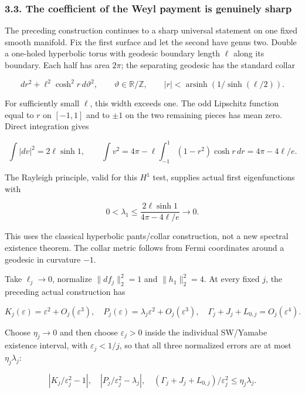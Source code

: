 \documentclass[
  10pt,
]{article}
\begin{document}
\hypertarget{the-coefficient-of-the-weyl-payment-is-genuinely-sharp}{%
\subsubsection{3.3. The coefficient of the Weyl payment is genuinely
sharp}\label{the-coefficient-of-the-weyl-payment-is-genuinely-sharp}}

The preceding construction continues to a sharp universal statement on
one fixed smooth manifold. Fix the first surface and let the second have
genus two. Double a one-holed hyperbolic torus with geodesic boundary
length \(\ell\) along its boundary. Each half has area \(2\pi\); the
separating geodesic has the standard collar

\[
 dr^2+\ell^2\cosh^2r\,d\vartheta^2,\qquad
 \vartheta\in\mathbb R/\mathbb Z,\qquad
 |r|<\operatorname{arsinh}(1/\sinh(\ell/2)).
\]

For sufficiently small \(\ell\), this width exceeds one. The odd
Lipschitz function equal to \(r\) on \([-1,1]\) and to \(\pm1\) on the
two remaining pieces has mean zero. Direct integration gives

\[
 \int|dv|^2=2\ell\sinh1,\qquad
 \int v^2=4\pi-\ell\int_{-1}^1(1-r^2)\cosh r\,dr
          =4\pi-4\ell/e.
\]

The Rayleigh principle, valid for this \(H^1\) test, supplies actual
first eigenfunctions with

\[
 0<\lambda_1\le\frac{2\ell\sinh1}{4\pi-4\ell/e}\longrightarrow0. \tag{3.9}
\]

This uses the classical hyperbolic pants/collar construction, not a new
spectral existence theorem. The collar metric follows from Fermi
coordinates around a geodesic in curvature \(-1\).

Take \(\ell_j\to0\), normalize \(\|df_j\|_2^2=1\) and \(\|h_1\|_2^2=4\).
At every fixed \(j\), the preceding actual construction has

\[
 K_j(\varepsilon)=\varepsilon^2+O_j(\varepsilon^3),\quad
 P_j(\varepsilon)=\lambda_j\varepsilon^2+O_j(\varepsilon^3),\quad
 \Gamma_j+J_j+L_{0,j}=O_j(\varepsilon^4).
\]

Choose \(\eta_j\to0\) and then choose \(\varepsilon_j>0\) inside the
individual SW/Yamabe existence interval, with \(\varepsilon_j<1/j\), so
that all three normalized errors are at most \(\eta_j\lambda_j\):

\[
 |K_j/\varepsilon_j^2-1|,\quad
 |P_j/\varepsilon_j^2-\lambda_j|,\quad
 (\Gamma_j+J_j+L_{0,j})/\varepsilon_j^2
                                      \le\eta_j\lambda_j.
\]
\end{document}
